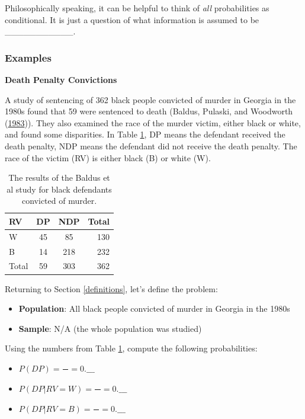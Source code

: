 \documentclass[]{book}
\providecommand{\tightlist}{%
  \setlength{\itemsep}{0pt}\setlength{\parskip}{0pt}}
\theoremstyle{definition}
\theoremstyle{definition}
\theoremstyle{remark}
\begin{document}
Philosophically speaking, it can be helpful to think of \emph{all}
probabilities as conditional. It is just a question of what information
is assumed to be \_\_\_\_\_\_\_\_\_\_\_.

\subsubsection{Examples}\label{examples-1}

\textbf{Death Penalty Convictions}

A study of sentencing of 362 black people convicted of murder in Georgia
in the 1980s found that 59 were sentenced to death (Baldus, Pulaski, and
Woodworth (\protect\hyperlink{ref-baldus}{1983})). They also examined
the race of the murder victim, either black or white, and found some
disparities. In Table \ref{tab:dp}, DP means the defendant received the
death penalty, NDP means the defendant did not receive the death
penalty. The race of the victim (RV) is either black (B) or white (W).

\begin{table}
\centering
\begin{tabular}{l|cc|r}
RV & DP & NDP & Total \\
\hline
W & 45 & 85 & 130 \\
B & 14 & 218 & 232 \\
\hline
Total & 59 & 303 & 362
\end{tabular}
\caption{\label{tab:dp}The results of the Baldus et al study for black defendants convicted of murder.}
\end{table}

Returning to Section \ref{definitions}, let's define the problem:

\begin{itemize}
\tightlist
\item
  \textbf{Population}: All black people convicted of murder in Georgia
  in the 1980s
\item
  \textbf{Sample}: N/A (the whole population was studied)
\end{itemize}

Using the numbers from Table \ref{tab:dp}, compute the following
probabilities:

\begin{itemize}
\tightlist
\item
  \(P(DP) = \frac{\quad}{\quad} = 0.\_\_\_\) \vspace{.1in}
\item
  \(P(DP | RV = W) = \frac{\quad}{\quad} = 0.\_\_\_\) \vspace{.1in}
\item
  \(P(DP | RV = B) = \frac{\quad}{\quad} = 0.\_\_\_\) \vspace{.1in}
\end{itemize}
\end{document}
